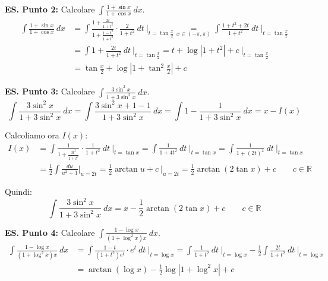 \documentclass{article}
\begin{document}
\noindent\textbf{ES. Punto 2:} Calcolare $\int \frac{1 + \sin x}{1 + \cos x} \ dx$.\\
\begin{align*}
    \int \frac{1 + \sin x}{1 + \cos x} \ dx &= \int \frac{1 + \frac{2t}{1 + t^2}}{1 + \frac{1 - t^2}{1 + t^2}} \cdot \frac{2}{1 + t^2} \ dt \ \bigg|_{t = \tan\frac{x}{2}} \underset{x \in (-\pi, \pi)}{=} \int \frac{1 + t^2 + 2t}{1 + t^2} \ dt \ \bigg|_{t = \tan\frac{x}{2}} \\
    &= \int 1 + \frac{2t}{1 + t^2} \ dt \ \bigg|_{t = \tan\frac{x}{2}} = t + \log|1 + t^2| + c \ \bigg|_{t = \tan\frac{x}{2}} \\
    &= \tan\frac{x}{2} + \log\left|1 + \tan^2\frac{x}{2}\right| + c
\end{align*}

\noindent\textbf{ES. Punto 3:} Calcolare $\int \frac{3\sin^2x}{1 + 3\sin^2x} \ dx$.\\
\begin{equation*}
    \int \frac{3\sin^2x}{1 + 3\sin^2x} \ dx = \int \frac{3\sin^2x + 1 - 1}{1 + 3\sin^2x} \ dx = \int 1 - \frac{1}{1 + 3\sin^2x} \ dx = x - I(x)
\end{equation*}

\noindent Calcoliamo ora $I(x)$:
\begin{align*}
    I(x) &= \int \frac{1}{1 + \frac{3t^2}{1 + t^2}} \cdot \frac{1}{1 + t^2} \ dt \ \bigg|_{t=\tan x} = \int \frac{1}{1 + 4t^2} \ dt \ \bigg|_{t=\tan x} = \int \frac{1}{1 + (2t)^2} \ dt \ \bigg|_{t=\tan x} \\
    &= \frac{1}{2} \int \frac{du}{u^2 + 1} \bigg|_{u = 2t} = \frac{1}{2} \arctan u + c \ \bigg|_{u = 2t} = \frac{1}{2} \arctan(2\tan x) + c \qquad c \in \mathbb{R}
\end{align*}

\noindent Quindi:
\begin{equation*}
    \int \frac{3\sin^2x}{1 + 3\sin^2x} \ dx = x - \frac{1}{2} \arctan(2\tan x) + c \qquad c \in \mathbb{R}
\end{equation*}

\noindent\textbf{ES. Punto 4:} Calcolare $\int \frac{1 - \log x}{(1 + \log^2x)x} \ dx$.\\
\begin{align*}
    \int \frac{1 - \log x}{(1 + \log^2x)x} \ dx &= \int \frac{1 - t}{(1 + t^2)e^t} \cdot e^t \ dt \ \bigg|_{t = \log x} = \int \frac{1}{1 + t^2} \ dt \ \bigg|_{t = \log x} - \frac{1}{2} \int \frac{2t}{1 + t^2} \ dt \ \bigg|_{t = \log x} \\
    &= \arctan(\log x) - \frac{1}{2} \log|1 + \log^2x| + c
\end{align*}
\end{document}
